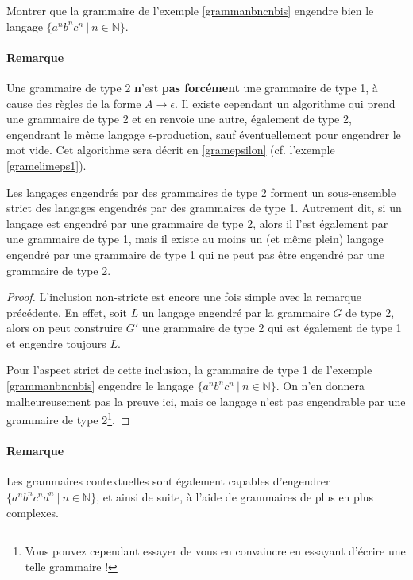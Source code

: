 \begin{exercice}
Montrer que la grammaire de l'exemple \ref{grammanbncnbis} engendre bien le langage \newline $\{a^nb^nc^n ~|~ n \in \mathbb{N}\}$.
\end{exercice}

\paragraph{Remarque} Une grammaire de type 2 \textbf{n}'est \textbf{pas forcément} une grammaire de type 1, à cause des règles de la forme $A \rightarrow \epsilon$. Il existe cependant un algorithme qui prend une grammaire de type 2 et en renvoie une autre, également de type 2, engendrant le même langage $\epsilon$-production, sauf éventuellement pour engendrer le mot vide. Cet algorithme sera décrit en \ref{gramepsilon} (cf. l'exemple \ref{gramelimeps1}). 

\begin{lemma}
Les langages engendrés par des grammaires de type 2 forment un sous-ensemble strict des langages engendrés par des grammaires de type 1. Autrement dit, si un langage est engendré par une grammaire de type 2, alors il l'est également par une grammaire de type 1, mais il existe au moins un (et même plein) langage engendré par une grammaire de type 1 qui ne peut pas être engendré par une grammaire de type 2.  
\end{lemma}

\begin{proof}
L'inclusion non-stricte est encore une fois simple avec la remarque précédente. En effet, soit $L$ un langage engendré par la grammaire $G$ de type 2, alors on peut construire $G'$ une grammaire de type 2 qui est également de type 1 et engendre toujours $L$.

Pour l'aspect strict de cette inclusion, la grammaire de type 1 de l'exemple \ref{grammanbncnbis} engendre le langage $\{a^nb^nc^n ~|~ n \in \mathbb{N}\}$. On n'en donnera malheureusement pas la preuve ici, mais ce langage n'est pas engendrable par une grammaire de type 2\footnote{Vous pouvez cependant essayer de vous en convaincre en essayant d'écrire une telle grammaire !}.
\end{proof}


\paragraph{Remarque} Les grammaires contextuelles sont également capables d'engendrer \newline $\{a^nb^nc^nd^n ~|~ n \in \mathbb{N}\}$, et ainsi de suite, à l'aide de grammaires de plus en plus complexes.



